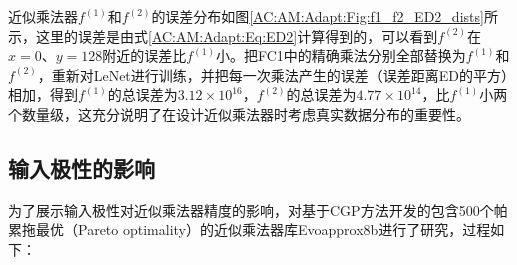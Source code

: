 近似乘法器$f^{(1)}$和$f^{(2)}$的误差分布如图\ref{AC:AM:Adapt:Fig:f1_f2_ED2_dists}所示，这里的误差是由式\eqref{AC:AM:Adapt:Eq:ED2}计算得到的，可以看到$f^{(2)}$在$x=0$、$y=128$附近的误差比$f^{(1)}$小。把FC1中的精确乘法分别全部替换为$f^{(1)}$和$f^{(2)}$，重新对LeNet进行训练，并把每一次乘法产生的误差（误差距离ED的平方）相加，得到$f^{(1)}$的总误差为$3.12 \times 10^{16}$，$f^{(2)}$的总误差为$4.77 \times 10^{14}$，比$f^{(1)}$小两个数量级，这充分说明了在设计近似乘法器时考虑真实数据分布的重要性。

\subsection{输入极性的影响}

为了展示输入极性对近似乘法器精度的影响，对基于CGP方法开发的包含500个帕累拖最优（Pareto optimality）的近似乘法器库Evoapprox8b\cite{AC:AM:CGP_Evoapprox8b}进行了研究，过程如下：

